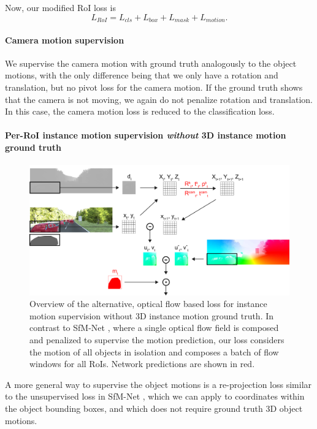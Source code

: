 Now, our modified RoI loss is
\begin{equation}
L_{RoI} = L_{cls} + L_{box} + L_{mask} + L_{motion}.
\end{equation}

\paragraph{Camera motion supervision}
We supervise the camera motion with ground truth analogously to the
object motions, with the only difference being that we only have
a rotation and translation, but no pivot loss for the camera motion.
If the ground truth shows that the camera is not moving, we again do not
penalize rotation and translation. In this case, the camera motion loss is reduced to the
classification loss.

\paragraph{Per-RoI instance motion supervision \emph{without} 3D instance motion ground truth}
\begin{figure}[t]
  \centering
  \includegraphics[width=\textwidth]{figures/flow_loss}
\caption{
Overview of the alternative, optical flow based loss for instance motion
supervision without 3D instance motion ground truth.
In contrast to SfM-Net \cite{SfmNet}, where a single optical flow field is
composed and penalized to supervise the motion prediction, our loss considers
the motion of all objects in isolation and composes a batch of flow windows
for all RoIs. Network predictions are shown in red.
}
\label{figure:flow_loss}
\end{figure}

A more general way to supervise the object motions is a re-projection
loss similar to the unsupervised loss in SfM-Net \cite{SfmNet},
which we can apply to coordinates within the object bounding boxes,
and which does not require ground truth 3D object motions.

